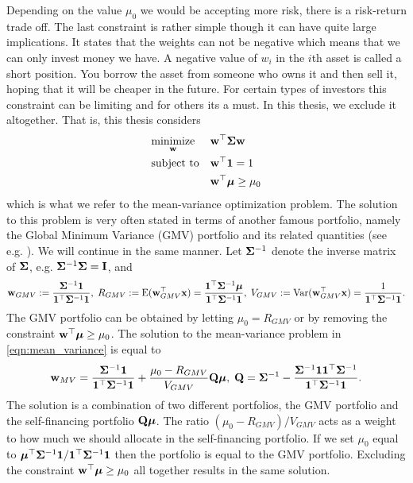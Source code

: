 \documentclass[]{book}\usepackage{knitr}
\begin{document}
Depending on the value $\mu_0$ we would be accepting more risk, there is a risk-return trade off. 
The last constraint is rather simple though it can have quite large implications. 
It states that the weights can not be negative which means that we can only invest money we have. 
A negative value of $w_i$ in the $i$th asset is called a short position.
You borrow the asset from someone who owns it and then sell it, hoping that it will be cheaper in the future.
For certain types of investors this constraint can be limiting and for others its a must.
In this thesis, we exclude it altogether. That is, this thesis considers
\begin{equation}\label{eqn:mean_variance}
\begin{aligned}
& \underset{\mathbf{w}}{\text{minimize}} 
& & \mathbf{w}^\top \mathbf{\Sigma} \mathbf{w} \\
& \text{subject to}
& & \mathbf{w}^\top \mathbf{1} = 1 \\
& && \mathbf{w}^\top \mbox{\boldmath$\mu$} \geq \mu_0 \\
\end{aligned}
\end{equation}
which is what we refer to the mean-variance optimization problem. The solution to this problem is very often stated in terms of another famous portfolio, namely the Global Minimum Variance (GMV) portfolio and its related quantities (see e.g. \textcite{Bodnar2009CaIotEFiEM, bodnar2013equivalence, bauder2018bayesian}). We will continue in the same manner. Let $\mathbf{\Sigma}^{-1}$ denote the inverse matrix of $\mathbf{\Sigma}$, e.g. $\mathbf{\Sigma}^{-1}\mathbf{\Sigma} = \mathbf{I}$, and
\begin{equation}
	\mathbf{w}_{GMV} := \frac{\mathbf{\Sigma}^{-1}\mathbf{1}}{\mathbf{1}^\top \mathbf{\Sigma}^{-1}\mathbf{1}}, \; R_{GMV} :=\operatorname{E}(\mathbf{w}_{GMV}^\top\mathbf{x}) = \frac{\mathbf{1}^\top\mathbf{\Sigma}^{-1}\mbox{\boldmath$\mu$}}{\mathbf{1}^\top \mathbf{\Sigma}^{-1}\mathbf{1}}, \;
	V_{GMV} := \operatorname{Var}(\mathbf{w}_{GMV}^\top\mathbf{x}) =\frac{1}{\mathbf{1}^\top \mathbf{\Sigma}^{-1}\mathbf{1}}.
\end{equation}
The GMV portfolio can be obtained by letting $\mu_0=R_{GMV}$ or by removing the constraint $\mathbf{w}^\top \mbox{\boldmath$\mu$} \geq \mu_0$. The solution to the mean-variance problem in \eqref{eqn:mean_variance} is equal to
\begin{equation}\label{eqn:mean_var_solution}
	\mathbf{w}_{MV} = \frac{\mathbf{\Sigma}^{-1}\mathbf{1}}{\mathbf{1}^\top \mathbf{\Sigma}^{-1}\mathbf{1}} + \frac{\mu_0 - R_{GMV}}{V_{GMV}} \mathbf{Q} \mbox{\boldmath$\mu$},\; \mathbf{Q} = \mathbf{\Sigma}^{-1} - \frac{\mathbf{\Sigma}^{-1} \mathbf{1} \mathbf{1}^\top \mathbf{\Sigma}^{-1}}{\mathbf{1}^\top \mathbf{\Sigma}^{-1} \mathbf{1}}.
\end{equation}
The solution is a combination of two different portfolios, the GMV portfolio and the self-financing portfolio $\mathbf{Q} \mbox{\boldmath$\mu$}$. The ratio $(\mu_0 - R_{GMV})/V_{GMV}$ acts as a weight to how much we should allocate in the self-financing portfolio. If we set $\mu_0$ equal to $\mbox{\boldmath$\mu$}^\top \mathbf{\Sigma}^{-1} \mathbf{1} / \mathbf{1}^\top \mathbf{\Sigma}^{-1} \mathbf{1}$ then the portfolio is equal to the GMV portfolio. Excluding the constraint $\mathbf{w}^\top \mbox{\boldmath$\mu$} \geq \mu_0$ all together results in the same solution. 
\end{document}

